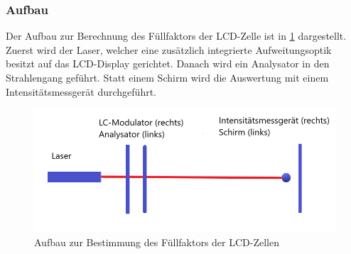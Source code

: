 \subsubsection{Aufbau}
Der Aufbau zur Berechnung des Füllfaktors der LCD-Zelle ist in \cref{422} dargestellt. Zuerst wird der Laser, welcher eine zusätzlich integrierte Aufweitungsoptik besitzt auf das LCD-Display gerichtet. Danach wird ein Analysator in den Strahlengang geführt. Statt einem Schirm wird die Auswertung mit einem Intensitätsmessgerät durchgeführt.
\begin{figure}[h!]
	\centering
	\includegraphics[scale = 1]{4.2.2-Aufbau.png}
	\caption{Aufbau zur Bestimmung des Füllfaktors der LCD-Zellen}
	\label{422}
\end{figure}
